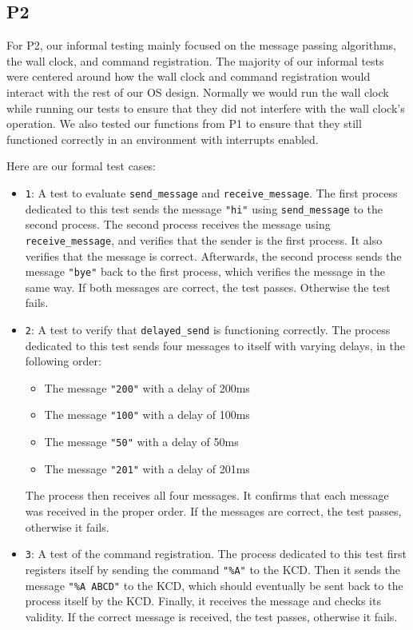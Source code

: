 \documentclass[12pt]{report}
\begin{document}
\subsection{P2}

For P2, our informal testing mainly focused on the message passing algorithms, the wall clock, and command registration.  The majority of our informal tests were centered around how the wall clock and command registration would interact with the rest of our OS design.  Normally we would run the wall clock while running our tests to ensure that they did not interfere with the wall clock's operation.  We also tested our functions from P1 to ensure that they still functioned correctly in an environment with interrupts enabled.

Here are our formal test cases:

\begin{itemize}
	\item \texttt{1}: A test to evaluate \texttt{send_message} and \texttt{receive_message}.  The first process dedicated to this test sends the message \texttt{"hi"} using \texttt{send_message} to the second process.  The second process receives the message using \texttt{receive_message}, and verifies that the sender is the first process.  It also verifies that the message is correct.  Afterwards, the second process sends the message \texttt{"bye"} back to the first process, which verifies the message in the same way.  If both messages are correct, the test passes.  Otherwise the test fails.
    \item \texttt{2}: A test to verify that \texttt{delayed_send} is functioning correctly.  The process dedicated to this test sends four messages to itself with varying delays, in the following order:
    \begin{itemize}
		\item The message \texttt{"200"} with a delay of 200ms
        \item The message \texttt{"100"} with a delay of 100ms
        \item The message \texttt{"50"} with a delay of 50ms
        \item The message \texttt{"201"} with a delay of 201ms
	\end{itemize}
    The process then receives all four messages.  It confirms that each message was received in the proper order.  If the messages are correct, the test passes, otherwise it fails.
    \item \texttt{3}: A test of the command registration.  The process dedicated to this test first registers itself by sending the command \texttt{"\%A"} to the KCD.  Then it sends the message \texttt{"\%A ABCD"} to the KCD, which should eventually be sent back to the process itself by the KCD.  Finally, it receives the message and checks its validity.  If the correct message is received, the test passes, otherwise it fails.
\end{itemize}
\end{document}
